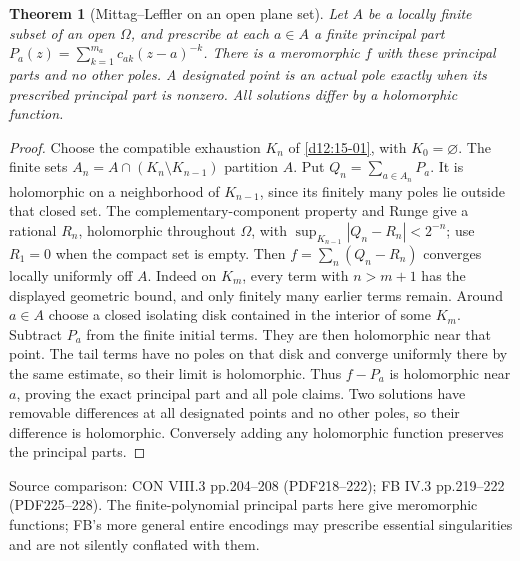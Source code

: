 \documentclass[11pt,a4paper,openany]{book}
\newtheorem{theorem}{Theorem}[chapter]
\theoremstyle{definition}
\theoremstyle{remark}\newtheorem{remark}[theorem]{Remark}
\newcommand{\family}[1]{}
\newcommand{\source}[1]{\par\begingroup\small\sffamily\color{black!65}Source comparison: #1\par\endgroup}
\begin{document}
\begin{theorem}[Mittag--Leffler on an open plane set]\family{D12.16.07}\label{d12:16-07}
Let $A$ be a locally finite subset of an open $\Omega$, and prescribe at each $a\in A$ a finite principal part $P_a(z)=\sum_{k=1}^{m_a}c_{ak}(z-a)^{-k}$. There is a meromorphic $f$ with these principal parts and no other poles. A designated point is an actual pole exactly when its prescribed principal part is nonzero. All solutions differ by a holomorphic function.
\end{theorem}
\begin{proof}
Choose the compatible exhaustion $K_n$ of \cref{d12:15-01}, with $K_0=\varnothing$. The finite sets $A_n=A\cap(K_n\setminus K_{n-1})$ partition $A$. Put $Q_n=\sum_{a\in A_n}P_a$. It is holomorphic on a neighborhood of $K_{n-1}$, since its finitely many poles lie outside that closed set. The complementary-component property and Runge give a rational $R_n$, holomorphic throughout $\Omega$, with $\sup_{K_{n-1}}|Q_n-R_n|<2^{-n}$; use $R_1=0$ when the compact set is empty. Then $f=\sum_n(Q_n-R_n)$ converges locally uniformly off $A$. Indeed on $K_m$, every term with $n>m+1$ has the displayed geometric bound, and only finitely many earlier terms remain.
Around $a\in A$ choose a closed isolating disk contained in the interior of some $K_m$. Subtract $P_a$ from the finite initial terms. They are then holomorphic near that point. The tail terms have no poles on that disk and converge uniformly there by the same estimate, so their limit is holomorphic. Thus $f-P_a$ is holomorphic near $a$, proving the exact principal part and all pole claims. Two solutions have removable differences at all designated points and no other poles, so their difference is holomorphic. Conversely adding any holomorphic function preserves the principal parts.
\end{proof}
\source{CON VIII.3 pp.204--208 (PDF218--222); FB IV.3 pp.219--222 (PDF225--228). The finite-polynomial principal parts here give meromorphic functions; FB's more general entire encodings may prescribe essential singularities and are not silently conflated with them.}
\end{document}
